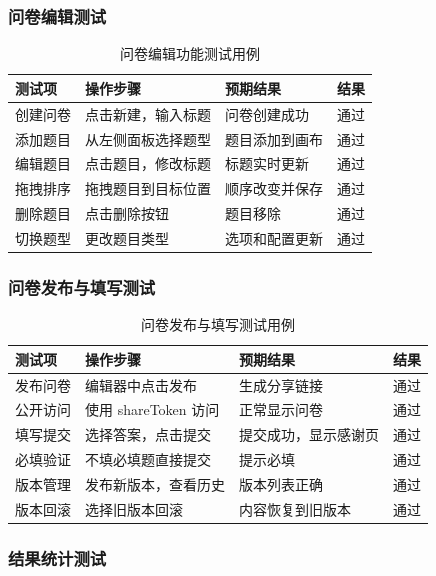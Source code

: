 \subsubsection{问卷编辑测试}

\begin{table}[H]
\centering
\caption{问卷编辑功能测试用例}
\label{tab:editor-test}
\begin{tabular}{p{3cm}p{4cm}p{3cm}p{2cm}}
\toprule
\textbf{测试项} & \textbf{操作步骤} & \textbf{预期结果} & \textbf{结果} \\
\midrule
创建问卷 & 点击新建，输入标题 & 问卷创建成功 & 通过 \\
添加题目 & 从左侧面板选择题型 & 题目添加到画布 & 通过 \\
编辑题目 & 点击题目，修改标题 & 标题实时更新 & 通过 \\
拖拽排序 & 拖拽题目到目标位置 & 顺序改变并保存 & 通过 \\
删除题目 & 点击删除按钮 & 题目移除 & 通过 \\
切换题型 & 更改题目类型 & 选项和配置更新 & 通过 \\
\bottomrule
\end{tabular}
\end{table}

\subsubsection{问卷发布与填写测试}

\begin{table}[H]
\centering
\caption{问卷发布与填写测试用例}
\label{tab:publish-test}
\begin{tabular}{p{3cm}p{4cm}p{3cm}p{2cm}}
\toprule
\textbf{测试项} & \textbf{操作步骤} & \textbf{预期结果} & \textbf{结果} \\
\midrule
发布问卷 & 编辑器中点击发布 & 生成分享链接 & 通过 \\
公开访问 & 使用 shareToken 访问 & 正常显示问卷 & 通过 \\
填写提交 & 选择答案，点击提交 & 提交成功，显示感谢页 & 通过 \\
必填验证 & 不填必填题直接提交 & 提示必填 & 通过 \\
版本管理 & 发布新版本，查看历史 & 版本列表正确 & 通过 \\
版本回滚 & 选择旧版本回滚 & 内容恢复到旧版本 & 通过 \\
\bottomrule
\end{tabular}
\end{table}

\subsubsection{结果统计测试}

